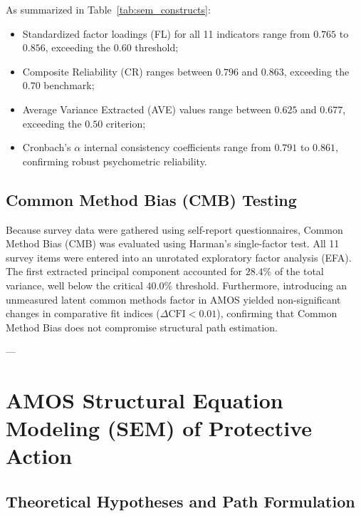 As summarized in Table~\ref{tab:sem_constructs}:
\begin{itemize}
    \item Standardized factor loadings (FL) for all 11 indicators range from $0.765$ to $0.856$, exceeding the $0.60$ threshold;
    \item Composite Reliability (CR) ranges between $0.796$ and $0.863$, exceeding the $0.70$ benchmark;
    \item Average Variance Extracted (AVE) values range between $0.625$ and $0.677$, exceeding the $0.50$ criterion;
    \item Cronbach's $\alpha$ internal consistency coefficients range from $0.791$ to $0.861$, confirming robust psychometric reliability.
\end{itemize}

\subsection{Common Method Bias (CMB) Testing}
\label{subsec:cmb_test}

Because survey data were gathered using self-report questionnaires, Common Method Bias (CMB) was evaluated using Harman's single-factor test. All 11 survey items were entered into an unrotated exploratory factor analysis (EFA). The first extracted principal component accounted for $28.4\%$ of the total variance, well below the critical $40.0\%$ threshold. Furthermore, introducing an unmeasured latent common methods factor in AMOS yielded non-significant changes in comparative fit indices ($\Delta \text{CFI} < 0.01$), confirming that Common Method Bias does not compromise structural path estimation.

---

\section{AMOS Structural Equation Modeling (SEM) of Protective Action}
\label{sec:amos_sem}

\subsection{Theoretical Hypotheses and Path Formulation}
\label{subsec:sem_hypotheses}

